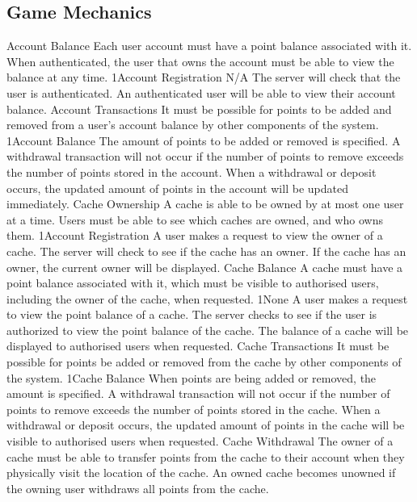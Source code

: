 	\subsection{Game Mechanics} %
		\funcreq %
			{Account Balance}
			{Each user account must have a point balance associated with it. 
			When authenticated, the user that owns the account must be able to
			view the balance at any time.}
			{1}{Account Registration}
			{N/A}
			{The server will check that the user is authenticated.}
			{An authenticated user will be able to view their account balance.}
		\funcreq %
			{Account Transactions}
			{It must be possible for points to be added and removed from a 
			user's account balance by other components of the system.}
			{1}{Account Balance}
			{The amount of points to be added or removed is specified.}
			{A withdrawal transaction will not occur if the number of points 
			to remove exceeds the number of points stored in the account.}
			{When a withdrawal or deposit occurs, the updated amount of points 
			in the account will be updated immediately.}
		\funcreq %
			{Cache Ownership}
			{A cache is able to be owned by at most one user at a time. Users 
			must be able to see which caches are owned, and who owns them.}
			{1}{Account Registration}
			{A user makes a request to view the owner of a cache.}
			{The server will check to see if the cache has an owner.}
			{If the cache has an owner, the current owner will be displayed.}
		\funcreq %
			{Cache Balance}
			{A cache must have a point balance associated with it, which must 
			be visible to authorised users, including the owner of the cache,
			when requested.}
			{1}{None}
			{A user makes a request to view the point balance of a cache.}
			{The server checks to see if the user is authorized to view the 
			point balance of the cache.}
			{The balance of a cache will be displayed to authorised users when 
			requested.}
		\funcreq %
			{Cache Transactions}
			{It must be possible for points be added or removed from the cache
			by other components of the system.}
			{1}{Cache Balance}
			{When points are being added or removed, the amount is specified.}
			{A withdrawal transaction will not occur if the number of points 
			to remove exceeds the number of points stored in the cache.}
			{When a withdrawal or deposit occurs, the updated amount of points 
			in the cache will be visible to authorised users when requested.}
		\funcreq %
			{Cache Withdrawal}
			{The owner of a cache must be able to transfer points from the 
			cache to their account when they physically visit the location of 
			the cache. An owned cache becomes unowned if the owning user 
			withdraws all points from the cache.}
